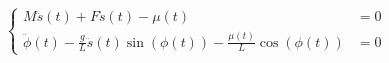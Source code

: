 \begin{equation}\label{eqofm}
\begin{cases}
  M \ddot{s}(t) + F \dot{s}(t) - \mu(t) & = 0 \\
    \ddot{\phi}(t) - \frac{g}{L} \ddot{s}(t) \sin({\phi}(t)) - \frac{\mu(t)}{L} \cos(\phi(t)) & = 0
\end{cases}
\end{equation}